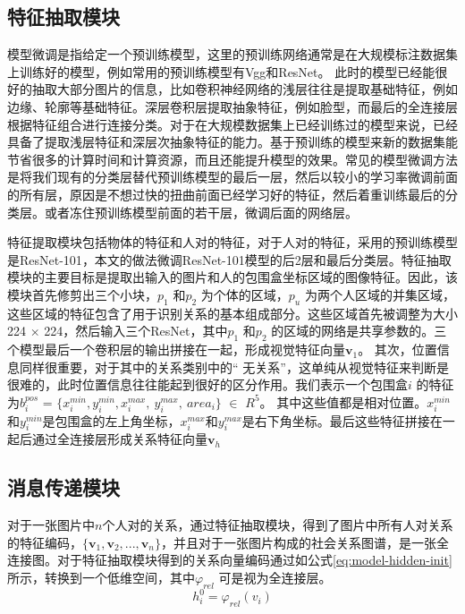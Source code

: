 \subsection{特征抽取模块}


模型微调是指给定一个预训练模型，这里的预训练网络通常是在大规模标注数据集上训练好的模型，例如常用的预训练模型有Vgg和ResNet。 此时的模型已经能很好的抽取大部分图片的信息，比如卷积神经网络的浅层往往是提取基础特征，例如边缘、轮廓等基础特征。深层卷积层提取抽象特征，例如脸型，而最后的全连接层根据特征组合进行连接分类。对于在大规模数据集上已经训练过的模型来说，已经具备了提取浅层特征和深层次抽象特征的能力。基于预训练的模型来新的数据集能节省很多的计算时间和计算资源，而且还能提升模型的效果。常见的模型微调方法是将我们现有的分类层替代预训练模型的最后一层，然后以较小的学习率微调前面的所有层，原因是不想过快的扭曲前面已经学习好的特征，然后着重训练最后的分类层。或者冻住预训练模型前面的若干层，微调后面的网络层。

特征提取模块包括物体的特征和人对的特征，对于人对的特征，采用的预训练模型是ResNet-101\cite{he2016deep}，本文的做法微调ResNet-101模型的后2层和最后分类层。特征抽取模块的主要目标是提取出输入的图片和人的包围盒坐标区域的图像特征。因此，该模块首先修剪出三个小块，$p_1$ 和$p_2$ 为个体的区域，$p_{u}$ 为两个人区域的并集区域，这些区域的特征包含了用于识别关系的基本组成部分。这些区域首先被调整为大小224 $\times$ 224，然后输入三个ResNet，其中$p_1$ 和$p_2$ 的区域的网络是共享参数的。三个模型最后一个卷积层的输出拼接在一起，形成视觉特征向量$\mathbf{v}_1$。 其次，位置信息同样很重要，对于其中的关系类别中的`` 无关系''，这单纯从视觉特征来判断是很难的，此时位置信息往往能起到很好的区分作用。我们表示一个包围盒$i$ 的特征为$b_i^{pos}$ = $\{ x_{i}^{min}, y_{i}^{min}, x_{i}^{max}, ~y_{i}^{max},~ area_{i} \}$ $\in$ $R^5$。 其中这些值都是相对位置。$x_{i}^{min}$和$y_{i}^{min}$是包围盒的左上角坐标，$x_{i}^{max}$和$y_{i}^{max}$是右下角坐标。最后这些特征拼接在一起后通过全连接层形成关系特征向量$\mathbf{v}_h$


\subsection{消息传递模块}

对于一张图片中$n$个人对的关系，通过特征抽取模块，得到了图片中所有人对关系的特征编码，$\{ \mathbf{v}_{1},\mathbf{v}_{2},...,\mathbf{v}_{n} \}$，并且对于一张图片构成的社会关系图谱，是一张全连接图。对于特征抽取模块得到的关系向量编码通过如公式\ref{eq:model-hidden-init}所示，转换到一个低维空间，其中$ \varphi_{rel} $ 可是视为全连接层。
\begin{equation} \label{eq:model-hidden-init}
    h_{i}^{0} = \varphi_{rel} (v_{i})
\end{equation}

